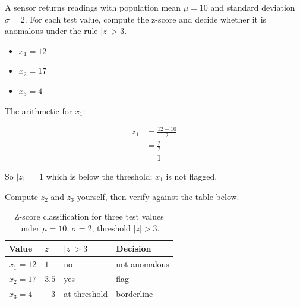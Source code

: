 \vspace{2.5em}

A sensor returns readings with population mean $\mu{=}10$ and standard deviation $\sigma{=}2$.
For each test value, compute the z-score and decide whether it is anomalous under the rule $|z| > 3$.

\begin{itemize}
    \item $x_1 = 12$
    \item $x_2 = 17$
    \item $x_3 = 4$
\end{itemize}

The arithmetic for $x_1$:

\begin{align*}
    z_1 &= \frac{12 - 10}{2} \\
        &= \frac{2}{2} \\
        &= 1
\end{align*}

So $|z_1| = 1$ which is below the threshold; $x_1$ is not flagged.

Compute $z_2$ and $z_3$ yourself, then verify against the table below.

\begin{table}[ht]
\centering
\begin{tabular}{p{}p{}p{}p{}}
    \toprule
    \textbf{Value} & \textbf{$z$} & \textbf{$|z| > 3$} & \textbf{Decision} \\
    \midrule
    $x_1 = 12$ & $1$  & no  & not anomalous \\
    $x_2 = 17$ & $3.5$ & yes & flag \\
    $x_3 = 4$  & $-3$ & at threshold & borderline \\
    \bottomrule
\end{tabular}
\vspace{2em}
\caption{Z-score classification for three test values under $\mu{=}10$, $\sigma{=}2$, threshold $|z|{>}3$.}
\label{tab:zscore_values}
\end{table}


